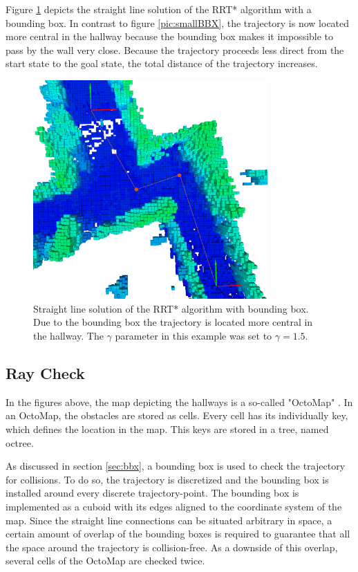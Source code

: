 Figure \ref{pic:bbx} depicts the straight line solution of the RRT* algorithm with a bounding box. In contrast to figure \ref{pic:smallBBX}, the trajectory is now located more central in the hallway because the bounding box makes it impossible to pass by the wall very close. Because the trajectory proceeds less direct from the start state to the goal state, the total distance of the trajectory increases. 

\begin{figure}[H]
   \centering
   \includegraphics[trim = 50mm 0mm 30mm 0mm,clip,width=0.8\textwidth]{pics/largeBBXP.png}
   \caption{Straight line solution of the RRT* algorithm with bounding box. Due to the bounding box the trajectory is located more central in the hallway. The $\gamma$ parameter in this example was set to $\gamma = 1.5$.}
   \label{pic:bbx}
\end{figure}

\subsection{Ray Check}

In the figures above, the map depicting the hallways is a so-called "OctoMap" \cite{OctoMap}. In an OctoMap, the obstacles are stored as cells. Every cell has its individually key, which defines the location in the map. This keys are stored in a tree, named octree.\newline

As discussed in section \ref{sec:bbx}, a bounding box is used to check the trajectory for collisions. To do so, the trajectory is discretized and the bounding box is installed around every discrete trajectory-point. The bounding box is implemented as a cuboid with its edges aligned to the coordinate system of the map. Since the straight line connections can be situated arbitrary in space, a certain amount of overlap of the bounding boxes is required to guarantee that all the space around the trajectory is collision-free. As a downside of this overlap, several cells of the OctoMap are checked twice.\newline

